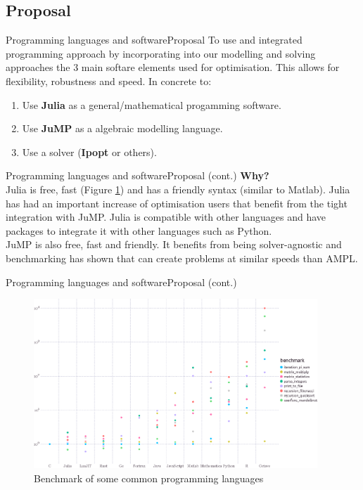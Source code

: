 \documentclass[handout]{beamer}
\begin{document}
\subsection{Proposal}
\begin{frame}[t]{Programming languages and software}{Proposal}
  To use and integrated programming approach by incorporating into our modelling and solving approaches the 3 main softare elements used for optimisation. This allows for flexibility, robustness and speed. In concrete to:\\[12pt]
\begin{enumerate}
  \item Use \textbf{Julia} as a general/mathematical progamming software.
  \item Use \textbf{JuMP} as a algebraic modelling language.
  \item Use a solver (\textbf{Ipopt} or others).
\end{enumerate}
\end{frame}

\begin{frame}[t]{Programming languages and software}{Proposal (cont.)}
  \textbf{Why?}\\[12pt]
  Julia is free, fast (Figure \ref{fig:speed}) and has a friendly syntax (similar to Matlab). Julia has had an important increase of optimisation users that benefit from the tight integration with JuMP. Julia is compatible with other languages and have packages to integrate it with other languages such as Python.\\[6pt]

  JuMP is also free, fast and friendly. It benefits from being solver-agnostic and benchmarking has shown that can create problems at similar speeds than AMPL.
\end{frame}

\begin{frame}[t]{Programming languages and software}{Proposal (cont.)}
  \begin{figure}
  \begin{center}
  \includegraphics[width=0.95\textwidth]{benchmarks.eps}
  \end{center}
  \caption{Benchmark of some common programming languages}\label{fig:speed}
  \end{figure}

\end{frame}
\end{document}
